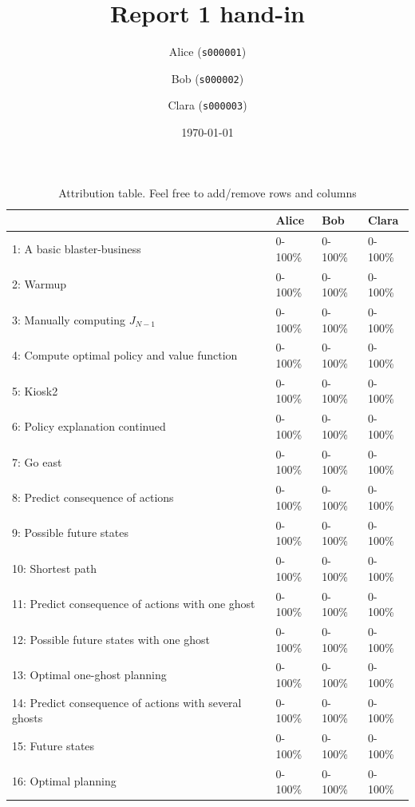 \documentclass[12pt,twoside]{article}
\title{ Report 1 hand-in }
\date{ \today }
\author{Alice (\texttt{s000001})\and  Bob (\texttt{s000002})\and Clara (\texttt{s000003}) }
\begin{document}
\maketitle

\begin{table}[ht!]
\caption{Attribution table. Feel free to add/remove rows and columns}
\begin{tabular}{llll}
\toprule
                                                        & Alice   & Bob    & Clara   \\
\midrule
 1: A basic blaster-business                            & 0-100\%  & 0-100\% & 0-100\%  \\
 2: Warmup                                              & 0-100\%  & 0-100\% & 0-100\%  \\
 3: Manually computing $J_{N-1}$                        & 0-100\%  & 0-100\% & 0-100\%  \\
 4: Compute optimal policy and value function           & 0-100\%  & 0-100\% & 0-100\%  \\
 5: Kiosk2                                              & 0-100\%  & 0-100\% & 0-100\%  \\
 6: Policy explanation continued                        & 0-100\%  & 0-100\% & 0-100\%  \\
 7: Go east                                             & 0-100\%  & 0-100\% & 0-100\%  \\
 8: Predict consequence of actions                      & 0-100\%  & 0-100\% & 0-100\%  \\
 9: Possible future states                              & 0-100\%  & 0-100\% & 0-100\%  \\
 10: Shortest path                                      & 0-100\%  & 0-100\% & 0-100\%  \\
 11: Predict consequence of actions with one ghost      & 0-100\%  & 0-100\% & 0-100\%  \\
 12: Possible future states with one ghost              & 0-100\%  & 0-100\% & 0-100\%  \\
 13: Optimal one-ghost planning                         & 0-100\%  & 0-100\% & 0-100\%  \\
 14: Predict consequence of actions with several ghosts & 0-100\%  & 0-100\% & 0-100\%  \\
 15: Future states                                      & 0-100\%  & 0-100\% & 0-100\%  \\
 16: Optimal planning                                   & 0-100\%  & 0-100\% & 0-100\%  \\
\bottomrule
\end{tabular}
\end{table}
\end{document}
